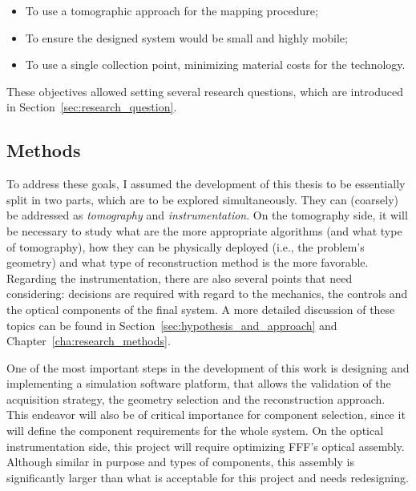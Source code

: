\begin{itemize}
    \item To use a tomographic approach for the mapping procedure;
    \item To ensure the designed system would be small and highly
        mobile;
    \item To use a single collection point, minimizing material costs
        for the technology.

\end{itemize}

These objectives allowed setting several research questions, which are
introduced in Section~\ref{sec:research_question}.

\subsection{Methods}%
\label{sub:methods}

To address these goals, I assumed the development of this thesis to be
essentially split in two parts, which are to be explored simultaneously.
They can (coarsely) be addressed as \emph{tomography} and
\emph{instrumentation}. On the tomography side, it will be necessary to
study what are the more appropriate algorithms (and what type of
tomography), how they can be physically deployed (i.e., the problem's
geometry) and what type of reconstruction method is the more favorable.
Regarding the instrumentation, there are also several points that need
considering: decisions are required with regard to the mechanics, the
controls and the optical components of the final system. A more detailed
discussion of these topics can be found in
Section~\ref{sec:hypothesis_and_approach} and
Chapter~\ref{cha:research_methods}.

One of the most important steps in the development of this work is
designing and implementing a simulation software platform, that allows
the validation of the acquisition strategy, the geometry selection and
the reconstruction approach. This endeavor will also be of critical
importance for component selection, since it will define the component
requirements for the whole system. On the optical instrumentation side,
this project will require optimizing \gls{FFF}'s optical assembly.
Although similar in purpose and types of components, this assembly is
significantly larger than what is acceptable for this project and needs
redesigning.


